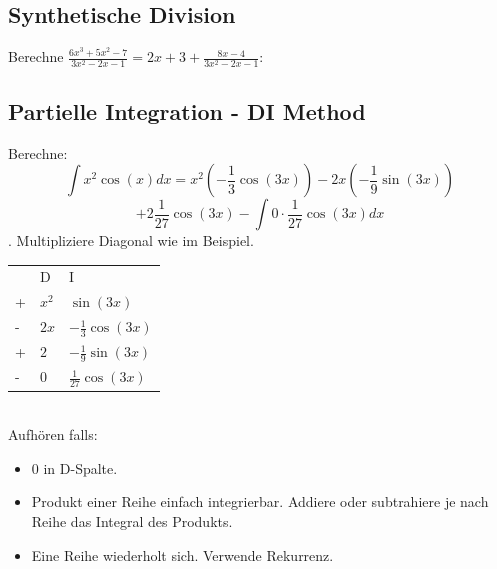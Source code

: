 \documentclass[a4paper,10pt]{article}
\begin{document}
\subsection{Synthetische Division}
Berechne $\frac{6x^3 + 5x^2 - 7}{3x^2 - 2x - 1} = 2x + 3 + \frac{8x - 4}{3x^2 -2x - 1}$:\\
\begin{center}
\end{center}

\subsection{Partielle Integration - DI Method}
Berechne:
$$\int x^2 \cos(x) dx = x^2 (-\frac{1}{3}\cos(3x)) - 2x(-\frac{1}{9}\sin(3x))$$
$$ + 2\frac{1}{27}\cos(3x) - \int 0 \cdot \frac{1}{27} \cos(3x) dx$$.
Multipliziere Diagonal wie im Beispiel.
\begin{table}[h]
  \begin{tabular}{lll}
    & D & I \\
  + & $x^2$ & $\sin(3x)$  \\
  - & $2x$ & $-\frac{1}{3}\cos(3x)$  \\
  + & $2$ & $-\frac{1}{9}\sin(3x)$  \\
  - & $0$ & $\frac{1}{27}\cos(3x)$  
  \end{tabular}
\end{table}\\
Aufhören falls:
\begin{itemize}
  \item $0$ in D-Spalte.
  \item Produkt einer Reihe einfach integrierbar. Addiere oder subtrahiere je nach Reihe das Integral des Produkts.
  \item Eine Reihe wiederholt sich. Verwende Rekurrenz.
\end{itemize}
\end{document}
